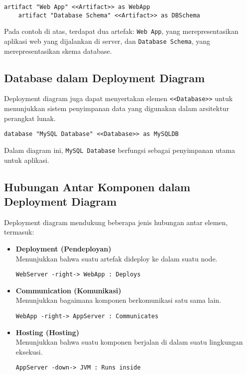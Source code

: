 \begin{lstlisting}[language=puml,caption={Contoh Artefak dalam Deployment Diagram}]
	artifact "Web App" <<Artifact>> as WebApp
	artifact "Database Schema" <<Artifact>> as DBSchema
\end{lstlisting}
Pada contoh di atas, terdapat dua artefak: \texttt{Web App}, yang merepresentasikan aplikasi web yang dijalankan di server, dan \texttt{Database Schema}, yang merepresentasikan skema database.

\subsection{Database dalam Deployment Diagram}
Deployment diagram juga dapat menyertakan elemen \texttt{<<Database>>} untuk menunjukkan sistem penyimpanan data yang digunakan dalam arsitektur perangkat lunak.

\begin{lstlisting}[language=puml,caption={Contoh Database dalam Deployment Diagram}]
	database "MySQL Database" <<Database>> as MySQLDB
\end{lstlisting}
Dalam diagram ini, \texttt{MySQL Database} berfungsi sebagai penyimpanan utama untuk aplikasi.

\subsection{Hubungan Antar Komponen dalam Deployment Diagram}
Deployment diagram mendukung beberapa jenis hubungan antar elemen, termasuk:

\begin{itemize}
	\item \textbf{Deployment (Pendeployan)} \\
	Menunjukkan bahwa suatu artefak dideploy ke dalam suatu node.
	\begin{lstlisting}[language=puml]
		WebServer -right-> WebApp : Deploys
	\end{lstlisting}
	
	\item \textbf{Communication (Komunikasi)} \\
	Menunjukkan bagaimana komponen berkomunikasi satu sama lain.
	\begin{lstlisting}[language=puml]
		WebApp -right-> AppServer : Communicates
	\end{lstlisting}
	
	\item \textbf{Hosting (Hosting)} \\
	Menunjukkan bahwa suatu komponen berjalan di dalam suatu lingkungan eksekusi.
	\begin{lstlisting}[language=puml]
		AppServer -down-> JVM : Runs inside
	\end{lstlisting}
\end{itemize}

